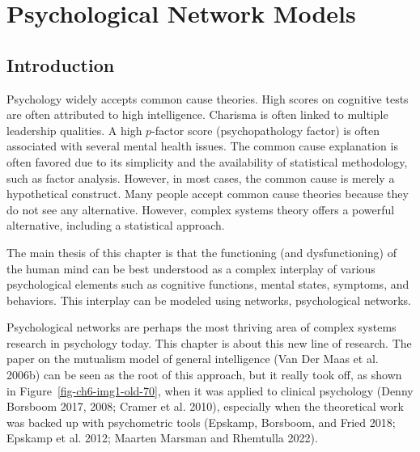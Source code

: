 \documentclass[
  a4paper,
  DIV=11,
  numbers=noendperiod,
  oneside]{scrreprt}
\begin{document}

\hypertarget{sec-ch6}{%
\chapter{Psychological Network Models}\label{sec-ch6}}

\hypertarget{sec-Introduction}{%
\section{Introduction}\label{sec-Introduction}}

Psychology widely accepts common cause theories. High scores on
cognitive tests are often attributed to high intelligence. Charisma is
often linked to multiple leadership qualities. A high \(p\)-factor score
(psychopathology factor) is often associated with several mental health
issues. The common cause explanation is often favored due to its
simplicity and the availability of statistical methodology, such as
factor analysis. However, in most cases, the common cause is merely a
hypothetical construct. Many people accept common cause theories because
they do not see any alternative. However, complex systems theory offers
a powerful alternative, including a statistical approach.

The main thesis of this chapter is that the functioning (and
dysfunctioning) of the human mind can be best understood as a complex
interplay of various psychological elements such as cognitive functions,
mental states, symptoms, and behaviors. This interplay can be modeled
using networks, psychological networks.

Psychological networks are perhaps the most thriving area of complex
systems research in psychology today. This chapter is about this new
line of research. The paper on the mutualism model of general
intelligence (Van Der Maas et al. 2006b) can be seen as the root of this
approach, but it really took off, as shown in
Figure~\ref{fig-ch6-img1-old-70}, when it was applied to clinical
psychology (Denny Borsboom 2017, 2008; Cramer et al. 2010), especially
when the theoretical work was backed up with psychometric tools
(Epskamp, Borsboom, and Fried 2018; Epskamp et al. 2012; Maarten Marsman
and Rhemtulla 2022).
\end{document}
